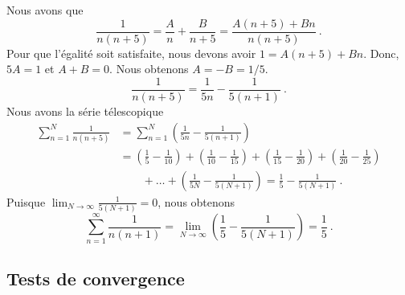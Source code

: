 { Nous avons que
\[
\frac{1}{n(n+5)} = \frac{A}{n} + \frac{B}{n+5} = \frac{A(n+5) + Bn}{n(n+5)} \ .
\]
Pour que l'égalité soit satisfaite, nous devons avoir
$1 = A(n+5) + Bn$.  Donc, $5A=1$ et $A+B = 0$.  Nous obtenons
$A = -B = 1/5$.
\[
\frac{1}{n(n+5)} = \frac{1}{5n} - \frac{1}{5(n+1)} \ .
\]
Nous avons la série télescopique
\begin{align*}
\sum_{n=1}^N \frac{1}{n(n+5)}
&= \sum_{n=1}^N \left(\frac{1}{5n} - \frac{1}{5(n+1)}\right) \\
&= \left(\frac{1}{5} - \frac{1}{10}\right)
+ \left(\frac{1}{10} - \frac{1}{15}\right)
+ \left(\frac{1}{15} - \frac{1}{20}\right)
+ \left(\frac{1}{20} - \frac{1}{25}\right) \\
& \qquad + \ldots + \left(\frac{1}{5N} - \frac{1}{5(N+1)}\right)
= \frac{1}{5} - \frac{1}{5(N+1)} \ .
\end{align*}
Puisque $\displaystyle \lim_{N\to \infty}\frac{1}{5(N+1)} = 0$, nous
obtenons
\[
  \sum_{n=1}^\infty \frac{1}{n(n+1)} =
\lim_{N\to \infty}\left( \frac{1}{5} - \frac{1}{5(N+1)}\right) =  \frac{1}{5} \ .
\]
}

\subsection{Tests de convergence}

